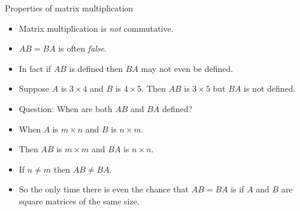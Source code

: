 \documentclass{beamer}
\begin{document}

\begin{frame}{Properties of matrix multiplication}

\begin{itemize}
\item Matrix multiplication is \emph{not} commutative.
\item $A B = B A$ is often \emph{false}.
\item In fact if $A B$ is defined then $B A$ may not even be defined.
\item Suppose $A$ is $3\times 4$ and $B$ is $4\times 5$. Then $A B$
is $3\times 5$ but $B A$ is not defined.
\item Question: When are both $A B$ and $B A$ defined?
\item When $A$ is $m\times n$ and $B$ is $n\times m$.
\item Then $A B$ is $m \times m$ and $B A$ is $n\times n$.
\item If $n\not= m$ then $A B \not= B A$.
\item So the only time there is even the chance that $A B = B A$ is
if $A$ and $B$ are square matrices of the same size.

\end{itemize}

\end{frame}

\end{document}
